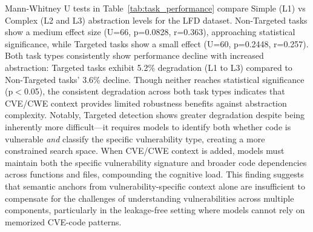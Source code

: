 \documentclass[lettersize,journal]{IEEEtran}
\begin{document}
Mann-Whitney U tests in Table~\ref{tab:task_performance} compare Simple (L1) vs Complex (L2 and L3) abstraction levels for the LFD dataset. Non-Targeted tasks show a medium effect size (U=66, p=0.0828, r=0.363), approaching statistical significance, while Targeted tasks show a small effect (U=60, p=0.2448, r=0.257). Both task types consistently show performance decline with increased abstraction: Targeted tasks exhibit 5.2\% degradation (L1 to L3) compared to Non-Targeted tasks' 3.6\% decline. Though neither reaches statistical significance (p$<$0.05), the consistent degradation across both task types indicates that CVE/CWE context provides limited robustness benefits against abstraction complexity. Notably, Targeted detection shows greater degradation despite being inherently more difficult—it requires models to identify both whether code is vulnerable \emph{and} classify the specific vulnerability type, creating a more constrained search space. When CVE/CWE context is added, models must maintain both the specific vulnerability signature and broader code dependencies across functions and files, compounding the cognitive load. This finding suggests that semantic anchors from vulnerability-specific context alone are insufficient to compensate for the challenges of understanding vulnerabilities across multiple components, particularly in the leakage-free setting where models cannot rely on memorized CVE-code patterns.
\end{document}
